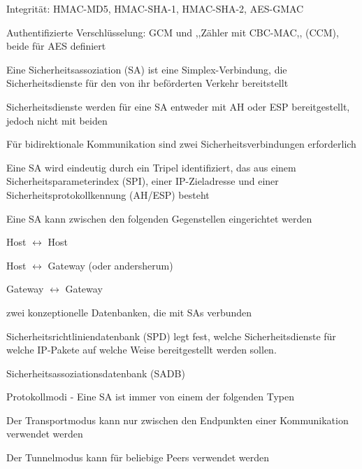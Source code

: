 \documentclass[a4paper]{article}
\begin{document}
\begin{multicols}{3}
\begin{itemize*}
\begin{itemize*}
                  \item Integrität: HMAC-MD5, HMAC-SHA-1, HMAC-SHA-2, AES-GMAC
                  \item Authentifizierte Verschlüsselung: GCM und ,,Zähler mit CBC-MAC,, (CCM), beide für AES definiert
            \end{itemize*}
            \item Eine Sicherheitsassoziation (SA) ist eine Simplex-Verbindung, die Sicherheitsdienste für den von ihr beförderten Verkehr bereitstellt
            \begin{itemize*}
                  \item Sicherheitsdienste werden für eine SA entweder mit AH oder ESP bereitgestellt, jedoch nicht mit beiden
                  \item Für bidirektionale Kommunikation sind zwei Sicherheitsverbindungen erforderlich
                  \item Eine SA wird eindeutig durch ein Tripel identifiziert, das aus einem Sicherheitsparameterindex (SPI), einer IP-Zieladresse und einer Sicherheitsprotokollkennung (AH/ESP) besteht
                  \item Eine SA kann zwischen den folgenden Gegenstellen eingerichtet werden
                  \begin{itemize*}
                        \item Host $\leftrightarrow$ Host
                        \item Host $\leftrightarrow$ Gateway (oder andersherum)
                        \item Gateway $\leftrightarrow$ Gateway
                  \end{itemize*}
                  \item zwei konzeptionelle Datenbanken, die mit SAs verbunden
                  \begin{itemize*}
                        \item Sicherheitsrichtliniendatenbank (SPD) legt fest, welche Sicherheitsdienste für welche IP-Pakete auf welche Weise bereitgestellt werden sollen.
                        \item Sicherheitsassoziationsdatenbank (SADB)
                  \end{itemize*}
            \end{itemize*}
            \item Protokollmodi - Eine SA ist immer von einem der folgenden Typen
            \begin{itemize*}
                  \item Der Transportmodus kann nur zwischen den Endpunkten einer Kommunikation verwendet werden
                  \item Der Tunnelmodus kann für beliebige Peers verwendet werden
            \end{itemize*}
      \end{itemize*}


\end{multicols}
\end{document}
